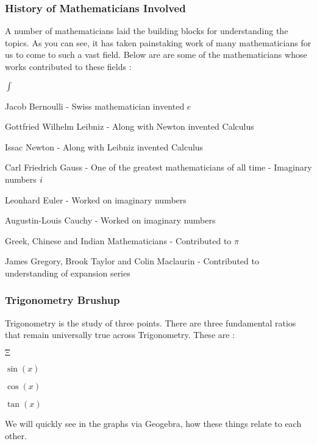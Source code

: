 \documentclass[10pt]{beamer}
\newcommand{\iu}{{i\mkern1mu}}
\begin{document}
\begin{frame}
	\frametitle{ History of Mathematicians Involved}

	A number o\label{key}f mathematicians laid the building blocks for understanding the topics.  As you can see, it has taken painstaking work of many mathematicians for us to come to such a vast field. Below are are some of the mathematicians whose works contributed to these fields :
	\vspace{10pt}

	\begin{list}{$\int$}{}
		\item Jacob Bernoulli - Swiss mathematician invented $e$
		\item  Gottfried Wilhelm Leibniz  - Along with Newton invented Calculus
		\item Issac Newton - Along with Leibniz invented Calculus
		\item Carl Friedrich Gauss - One of the greatest mathematicians of all time - Imaginary numbers $\iu$
		\item Leonhard Euler - Worked on imaginary numbers
		\item Augustin-Louis Cauchy - Worked on imaginary numbers
		\item Greek, Chinese and Indian Mathematicians - Contributed to $\pi$
		\item James Gregory, Brook Taylor and Colin Maclaurin - Contributed to understanding of expansion series
	\end{list}
\end{frame}

\begin{frame}
	\frametitle{Trigonometry Brushup}
	Trigonometry is the study of three points.  There are three fundamental ratios that remain universally true across Trigonometry.  These are :
	\begin{list}{$\Upxi$}{}
		\item $\sin(x)$
		\item $\cos(x)$
		\item $\tan(x)$
	\end{list}

	We will quickly see in the graphs via Geogebra, how these things relate to each other.
	
\end{frame}
\end{document}
